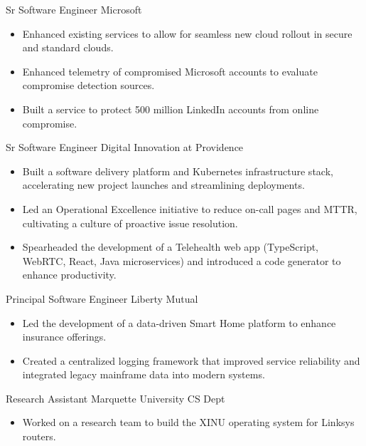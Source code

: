 \documentclass[11pt,a4paper,sans]{moderncv}
\begin{document}
        {Sr Software Engineer}
        {Microsoft}
        {}
        {}
        {
          \begin{itemize}
            \item Enhanced existing services to allow for seamless new cloud rollout in secure and standard clouds.
            \item Enhanced telemetry of compromised Microsoft accounts to evaluate compromise detection sources.
            \item Built a service to protect 500 million LinkedIn accounts from online compromise.
          \end{itemize}
        }

        {Sr Software Engineer}
        {Digital Innovation at Providence}
        {}
        {}
        {
          \begin{itemize}
            \item Built a software delivery platform and Kubernetes infrastructure stack, accelerating new project launches and streamlining deployments.
            \item Led an Operational Excellence initiative to reduce on-call pages and MTTR, cultivating a culture of proactive issue resolution.
            \item Spearheaded the development of a Telehealth web app (TypeScript, WebRTC, React, Java microservices) and introduced a code generator to enhance productivity.
          \end{itemize}
        }

        {Principal Software Engineer}
        {Liberty Mutual}
        {}
        {}
        {
          \begin{itemize}
            \item Led the development of a data-driven Smart Home platform to enhance insurance offerings.
            \item Created a centralized logging framework that improved service reliability and integrated legacy mainframe data into modern systems.
          \end{itemize}
        }

        {Research Assistant}
        {Marquette University CS Dept}
        {}
        {}
        {
          \begin{itemize}
            \item Worked on a research team to build the XINU operating system for Linksys routers.
          \end{itemize}
        }
\end{document}
